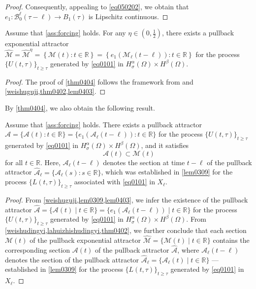\documentclass[oneside,preprint,12pt,numbers,sort&compress]{elsarticle}
\begin{document}
\begin{proof}
Consequently, appealing to \cref{eq050202}, we obtain that $e_1: \mathcal{B}_0^\ell(\tau-\ell) \to B_1(\tau)$ is Lipschitz continuous.
\end{proof}

\begin{theorem}\label{thm0404}
Assume that \cref{ass:forcing} holds. For any \(\eta \in (0, \frac{1}{2})\), there exists a pullback exponential attractor $\hat{\mathcal{M}} = \hat{\mathcal{M}}^\eta = \left\{ \mathcal{M} (t): t \in \mathbb{R} \right\} = \left\{ e_{1}(\mathcal{M}_{\ell} (t-\ell)) : t \in \mathbb{R} \right\} $ for the process \(\{ U(t, \tau) \}_{t \geq \tau}\) generated by \cref{eq0101} in $H_\sigma^{\alpha}(\Omega) \times H^{\beta}(\Omega)$.
\end{theorem}

\begin{proof}
The proof of \cref{thm0404} follows the framework from \cite{LY2020,AT2021,YouB2023,YouB2021} and \cref{weishuguji,thm0402,lem0403}.
\end{proof}

By \cref{thm0404}, we also obtain the following result.
\begin{theorem}
Assume that \cref{ass:forcing} holds. There exists a pullback attractor \(\hat{\mathcal{A}} = \{\mathcal{A}(t) : t \in \mathbb{R}\} = \{e_1(\mathcal{A}_{\ell}(t-\ell)) : t \in \mathbb{R}\}\) for the process \(\{U(t, \tau)\}_{t \geq \tau}\) generated by \cref{eq0101} in $H_\sigma^{\alpha}(\Omega) \times H^{\beta}(\Omega)$, and it satisfies 
$$\mathcal{A}(t) \subset \mathcal{M}(t)$$
for all \(t \in \mathbb{R}\). Here, \(\mathcal{A}_{\ell}(t-\ell)\) denotes the section at time \(t-\ell\) of the pullback attractor \(\hat{\mathcal{A}}_{\ell} = \{\mathcal{A}_{\ell}(s) : s \in \mathbb{R}\}\), which was established in \cref{lem0309} for the process \(\{L(t, \tau)\}_{t \geq \tau}\) associated with \cref{eq0101} in \(X_{\ell}\).
\end{theorem}
\begin{proof}
From \cref{weishuguji,lem0309,lem0403}, we infer the existence of the pullback attractor \(\hat{\mathcal{A}} = \{\mathcal{A}(t) \mid t \in \mathbb{R} \} = \{ e_1(\mathcal{A}_\ell(t-\ell)) \mid t \in \mathbb{R} \}\) for the process \(\{ U(t, \tau) \}_{t \geq \tau}\) generated by \cref{eq0101} in $H_\sigma^{\alpha}(\Omega) \times H^{\beta}(\Omega)$. From \cref{weishudingyi,lahuizhishudingyi,thm0402}, we further conclude that each section \(\mathcal{M}(t)\) of the pullback exponential attractor \(\hat{\mathcal{M}} = \{ \mathcal{M}(t) \mid t \in \mathbb{R} \}\) contains the corresponding section \(\mathcal{A}(t)\) of the pullback attractor \(\hat{\mathcal{A}}\), where \(\mathcal{A}_\ell(t-\ell)\) denotes the section of the pullback attractor \(\hat{\mathcal{A}}_\ell = \{ \mathcal{A}_\ell(t) \mid t \in \mathbb{R} \}\) — established in \cref{lem0309} for the process \(\{ L(t, \tau) \}_{t \geq \tau}\) generated by \cref{eq0101} in \(X_\ell\).
\end{proof}
\end{document}
